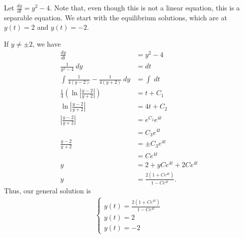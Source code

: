 \documentclass[10pt]{mypackage}
\begin{document}
\begin{example}
  Let $\frac{dy}{dt} = y^2 - 4$. Note that, even though this is not a linear equation, this is a separable equation. We start with the equilibrium solutions, which are at $y(t) = 2$ and $y(t) = -2$.\newline

  If $y\neq \pm 2$, we have
  \begin{align*}
    \frac{dy}{dt} &= y^2 - 4\\
    \frac{1}{y^2 - 4}\:dy &= dt\\
    \int_{}^{} \frac{1}{4(y-2)} - \frac{1}{4(y+2)}\:dy &= \int_{}^{} \:dt\\
    \frac{1}{4}\left(\ln\left|\frac{y-2}{y+2}\right|\right) &= t + C_1\\
    \ln \left\vert \frac{y-2}{y+2} \right\vert &= 4t + C_2\\
    \left\vert \frac{y-2}{y+2} \right\vert &= e^{C_2}e^{4t}\\
                                           &= C_3e^{4t}\\
    \frac{y-2}{y+2} &=  \pm C_3 e^{4t}\\
                    &= C e^{4t}\\
    y &= 2 + y Ce^{4t} + 2Ce^{4t}\\
    y &= \frac{2\left(1 + Ce^{4t}\right)}{1-Ce^{4t}}.
  \end{align*}
  Thus, our general solution is
  \begin{align*}
    \begin{cases}
     y(t) = \frac{2\left(1 + Ce^{4t}\right)}{1-Ce^{4t}} \\
     y(t) = 2\\
     y(t) = -2
    \end{cases}
  \end{align*}
\end{example}
\end{document}
